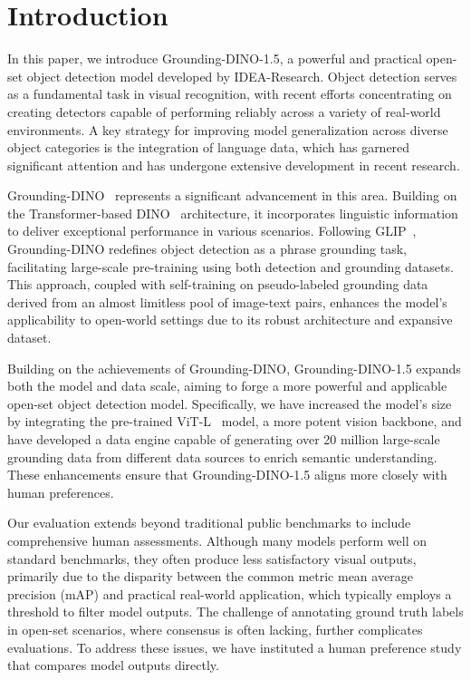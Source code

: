 \section{Introduction}
In this paper, we introduce Grounding-DINO-1.5, a powerful and practical open-set object detection model developed by IDEA-Research. 
Object detection serves as a fundamental task in visual recognition, with recent efforts concentrating on creating detectors capable of performing reliably across a variety of real-world environments. 
A key strategy for improving model generalization across diverse object categories is the integration of language data, which has garnered significant attention and has undergone extensive development in recent research.


Grounding-DINO~\cite{GroundingDINO} represents a significant advancement in this area. 
Building on the Transformer-based DINO~\cite{DINO} architecture, it incorporates linguistic information to deliver exceptional performance in various scenarios. 
Following GLIP~\cite{GLIP}, Grounding-DINO redefines object detection as a phrase grounding task, facilitating large-scale pre-training using both detection and grounding datasets. 
This approach, coupled with self-training on pseudo-labeled grounding data derived from an almost limitless pool of image-text pairs, enhances the model’s applicability to open-world settings due to its robust architecture and expansive dataset.

Building on the achievements of Grounding-DINO, Grounding-DINO-1.5 expands both the model and data scale, aiming to forge a more powerful and applicable open-set object detection model. 
Specifically, we have increased the model’s size by integrating the pre-trained ViT-L~\cite{EVA-02} model, a more potent vision backbone, and have developed a data engine capable of generating over 20 million large-scale grounding data from different data sources to enrich semantic understanding. 
These enhancements ensure that Grounding-DINO-1.5 aligns more closely with human preferences.

Our evaluation extends beyond traditional public benchmarks to include comprehensive human assessments. 
Although many models perform well on standard benchmarks, they often produce less satisfactory visual outputs, primarily due to the disparity between the common metric mean average precision (mAP) and practical real-world application, which typically employs a threshold to filter model outputs. 
The challenge of annotating ground truth labels in open-set scenarios, where consensus is often lacking, further complicates evaluations.
To address these issues, we have instituted a human preference study that compares model outputs directly.

